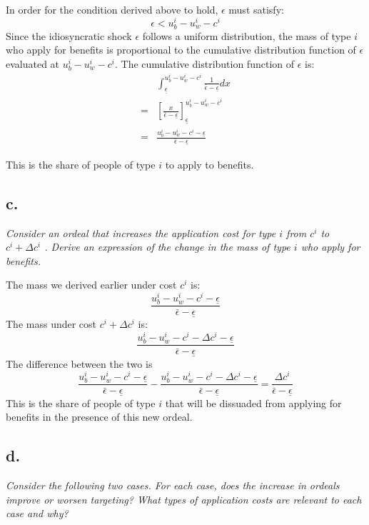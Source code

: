 \documentclass[
]{article}
\begin{document}
In order for the condition derived above to hold, \(\epsilon\) must
satisfy: \[\epsilon < u_b^i - u_w^i - c^i\] Since the idiosyncratic
shock \(\epsilon\) follows a uniform distribution, the mass of type
\(i\) who apply for benefits is proportional to the cumulative
distribution function of \(\epsilon\) evaluated at
\(u_b^i - u_w^i - c^i\). The cumulative distribution function of
\(\epsilon\) is: \[\begin{aligned}  
&\int _{\underline{\epsilon}} ^{u_b^i - u_w^i - c^i} \frac{1}{\bar{\epsilon} - \underline{\epsilon}} dx \\
=& [\frac{x}{\bar{\epsilon} - \underline{\epsilon}}]^{u_b^i - u_w^i - c^i}_{\underline{\epsilon}} \\
=& \frac{u_b^i - u_w^i - c^i - \underline{\epsilon}}{\bar{\epsilon} - \underline{\epsilon}}
\end{aligned}\]

This is the share of people of type \(i\) to apply to benefits.

\hypertarget{c.}{%
\subsection{c.~}\label{c.}}

\textit{Consider an ordeal that increases the application cost for type $i$ from $c^i$ to $c^i+ \Delta c^i$ . Derive an expression of the change in the mass of type $i$ who apply for benefits.}

The mass we derived earlier under cost \(c^i\) is:
\[\frac{u_b^i - u_w^i - c^i - \underline{\epsilon}}{\bar{\epsilon} - \underline{\epsilon}}\]
The mass under cost \(c^i+\Delta c^i\) is:
\[\frac{u_b^i - u_w^i - c^i - \Delta c^i - \underline{\epsilon}}{\bar{\epsilon} - \underline{\epsilon}}\]
The difference between the two is
\[\frac{u_b^i - u_w^i - c^i - \underline{\epsilon}}{\bar{\epsilon} - \underline{\epsilon}} - \frac{u_b^i - u_w^i - c^i - \Delta c^i - \underline{\epsilon}}{\bar{\epsilon} - \underline{\epsilon}} = \frac{\Delta c^i}{\bar{\epsilon} - \underline{\epsilon}}\]
This is the share of people of type \(i\) that will be dissuaded from
applying for benefits in the presence of this new ordeal.

\hypertarget{d.}{%
\subsection{d.~}\label{d.}}

\textit{Consider the following two cases. For each case, does the increase in ordeals improve or worsen targeting? What types of application costs are relevant to each case and why?}
\end{document}
